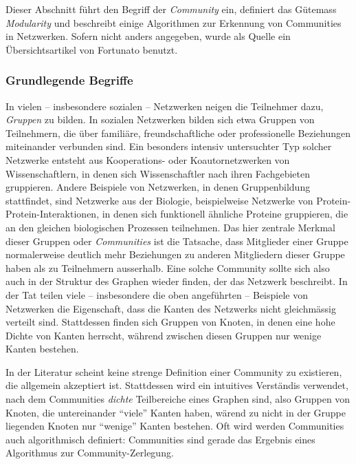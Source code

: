 Dieser Abschnitt f\"uhrt den Begriff der \emph{Community} ein,
definiert das G\"utemass \emph{Modularity} und beschreibt einige
Algorithmen zur Erkennung von Communities in Netzwerken. Sofern nicht
anders angegeben, wurde als Quelle ein \"Ubersichtsartikel von
Fortunato \cite{Fortunato2010} benutzt.

\subsubsection{Grundlegende Begriffe}
\label{sec:grundl-begr}

In vielen -- insbesondere sozialen -- Netzwerken neigen die Teilnehmer
dazu, \emph{Gruppen} zu bilden. In sozialen Netzwerken bilden sich
etwa Gruppen von Teilnehmern, die \"uber famili\"are,
freundschaftliche oder professionelle Beziehungen miteinander
verbunden sind. Ein besonders intensiv untersuchter Typ solcher
Netzwerke entsteht aus Kooperations- oder Koautornetzwerken von
Wissenschaftlern, in denen sich Wissenschaftler nach ihren
Fachgebieten gruppieren. Andere Beispiele von Netzwerken, in denen
Gruppenbildung stattfindet, sind Netzwerke aus der Biologie,
beispielweise Netzwerke von Protein-Protein-Interaktionen, in denen
sich funktionell \"ahnliche Proteine gruppieren, die an den gleichen
biologischen Prozessen teilnehmen. Das hier zentrale Merkmal dieser
Gruppen oder \emph{Communities} ist die Tatsache, dass Mitglieder
einer Gruppe normalerweise deutlich mehr Beziehungen zu anderen
Mitgliedern dieser Gruppe haben als zu Teilnehmern ausserhalb. Eine
solche Community sollte sich also auch in der Struktur des Graphen
wieder finden, der das Netzwerk beschreibt. In der Tat teilen viele --
insbesondere die oben angef\"uhrten -- Beispiele von Netzwerken die
Eigenschaft, dass die Kanten des Netzwerks nicht gleichm\"assig
verteilt sind. Stattdessen finden sich Gruppen von Knoten, in denen
eine hohe Dichte von Kanten herrscht, w\"ahrend zwischen diesen
Gruppen nur wenige Kanten bestehen.

In der Literatur scheint keine strenge Definition einer Community zu
existieren, die allgemein akzeptiert ist. Stattdessen wird ein
intuitives Verst\"andis verwendet, nach dem Communities \emph{dichte}
Teilbereiche eines Graphen sind, also Gruppen von Knoten, die
untereinander ``viele'' Kanten haben, w\"arend zu nicht in der Gruppe
liegenden Knoten nur ``wenige'' Kanten bestehen. Oft wird werden
Communities auch algorithmisch definiert: Communities sind gerade das
Ergebnis eines Algorithmus zur Community-Zerlegung.

